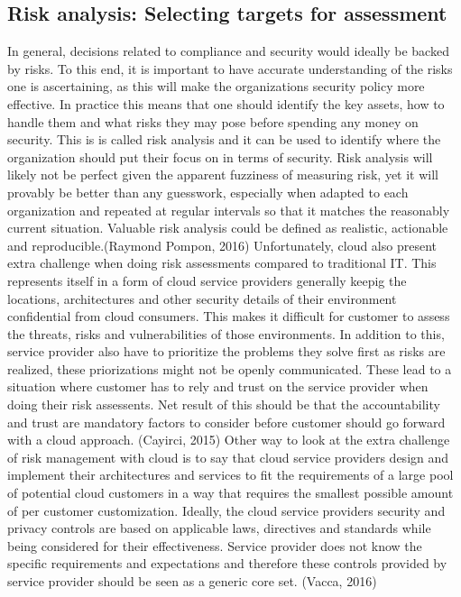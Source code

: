 \documentclass{article}
\begin{document}
\subsection{Risk analysis: Selecting targets for assessment}
In general, decisions related to compliance and security would ideally be backed by risks. To this end, it is important to have accurate understanding of the risks one is ascertaining, as this will make the organizations security policy more effective.
In practice this means that one should identify the key assets, how to handle them and what risks they may pose before spending any money on security. This is is called risk analysis and it can be used to identify where the organization should put their focus on in terms of security. Risk analysis will likely not be perfect given the apparent fuzziness of measuring risk, yet it will provably be better than any guesswork, especially when adapted to each organization and repeated at regular intervals so that it matches the reasonably current situation. Valuable risk analysis could be defined as realistic, actionable and reproducible.(Raymond Pompon, 2016)
Unfortunately, cloud also present extra challenge when doing risk assessments compared to traditional IT. This represents itself in a form of cloud service providers generally keepig the locations, architectures and other security details of their environment confidential from cloud consumers. This makes it difficult for customer to assess the threats, risks and vulnerabilities of those environments. In addition to this, service provider also have to prioritize the problems they solve first as risks are realized, these priorizations might not be openly communicated. These lead to a situation where customer has to rely and trust on the service provider when doing their risk assessents. Net result of this should be that the accountability and trust are mandatory factors to consider before customer should go forward with a cloud approach. (Cayirci, 2015)
Other way to look at the extra challenge of risk management with cloud is to say that cloud service providers design and implement their architectures and services to fit the requirements of a large pool of potential cloud customers in a way that requires the smallest possible amount of per customer customization. Ideally, the cloud service providers security and privacy controls are based on applicable laws, directives and standards while being considered for their effectiveness. Service provider does not know the specific requirements and expectations and therefore these controls provided by service provider should be seen as a generic core set. (Vacca, 2016)
\end{document}
